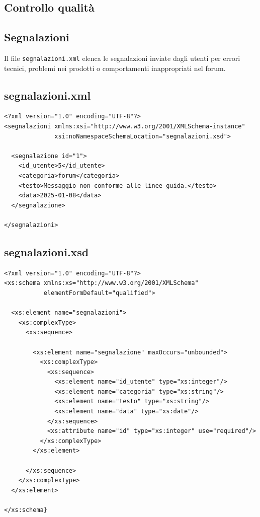\documentclass[a4paper,12pt]{report}
\begin{document}


\subsection{Controllo qualità}
\label{sec:xml-controllo}


\subsection*{Segnalazioni}

Il file \texttt{segnalazioni.xml} elenca le segnalazioni inviate dagli utenti
per errori tecnici, problemi nei prodotti o comportamenti inappropriati nel forum.

\subsection*{segnalazioni.xml}

\begin{lstlisting}
<?xml version="1.0" encoding="UTF-8"?>
<segnalazioni xmlns:xsi="http://www.w3.org/2001/XMLSchema-instance"
              xsi:noNamespaceSchemaLocation="segnalazioni.xsd">

  <segnalazione id="1">
    <id_utente>5</id_utente>
    <categoria>forum</categoria>
    <testo>Messaggio non conforme alle linee guida.</testo>
    <data>2025-01-08</data>
  </segnalazione>

</segnalazioni>
\end{lstlisting}

\subsection*{segnalazioni.xsd}

\begin{lstlisting}
<?xml version="1.0" encoding="UTF-8"?>
<xs:schema xmlns:xs="http://www.w3.org/2001/XMLSchema"
           elementFormDefault="qualified">

  <xs:element name="segnalazioni">
    <xs:complexType>
      <xs:sequence>

        <xs:element name="segnalazione" maxOccurs="unbounded">
          <xs:complexType>
            <xs:sequence>
              <xs:element name="id_utente" type="xs:integer"/>
              <xs:element name="categoria" type="xs:string"/>
              <xs:element name="testo" type="xs:string"/>
              <xs:element name="data" type="xs:date"/>
            </xs:sequence>
            <xs:attribute name="id" type="xs:integer" use="required"/>
          </xs:complexType>
        </xs:element>

      </xs:sequence>
    </xs:complexType>
  </xs:element>

</xs:schema}
\end{lstlisting}
\end{document}
